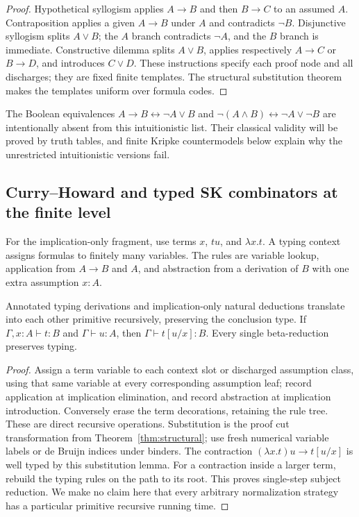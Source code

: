 \begin{proof}
Hypothetical syllogism applies $A\to B$ and then $B\to C$ to an assumed
$A$. Contraposition applies a given $A\to B$ under $A$ and contradicts
$\neg B$. Disjunctive syllogism splits $A\vee B$; the $A$ branch contradicts
$\neg A$, and the $B$ branch is immediate. Constructive dilemma splits
$A\vee B$, applies respectively $A\to C$ or $B\to D$, and introduces
$C\vee D$. These instructions specify each proof node and all discharges;
they are fixed finite templates. The structural substitution theorem
makes the templates uniform over formula codes.
\end{proof}

The Boolean equivalences $A\to B\leftrightarrow\neg A\vee B$ and
$\neg(A\wedge B)\leftrightarrow\neg A\vee\neg B$ are intentionally absent
from this intuitionistic list. Their classical validity will be proved
by truth tables, and finite Kripke countermodels below explain why the
unrestricted intuitionistic versions fail.

\subsection{Curry--Howard and typed SK combinators at the finite level}

For the implication-only fragment, use terms $x$, $tu$, and $\lambda x.t$.
A typing context assigns formulas to finitely many variables. The rules
are variable lookup, application from $A\to B$ and $A$, and abstraction
from a derivation of $B$ with one extra assumption $x:A$.

\begin{theorem}\label{thm:curry-howard}
Annotated typing derivations and implication-only natural deductions
translate into each other primitive recursively, preserving the conclusion
type. If $\Gamma,x:A\vdash t:B$ and $\Gamma\vdash u:A$, then
$\Gamma\vdash t[u/x]:B$. Every single beta-reduction preserves typing.
\end{theorem}
\begin{proof}
Assign a term variable to each context slot or discharged assumption class,
using that same variable at every corresponding assumption leaf; record application
at implication elimination, and record abstraction at implication
introduction. Conversely erase the term decorations, retaining the rule
tree. These are direct recursive operations. Substitution is the proof
cut transformation from Theorem~\ref{thm:structural}; use fresh numerical
variable labels or de Bruijn indices under binders. The contraction
$(\lambda x.t)u\longrightarrow t[u/x]$ is well typed by this substitution
lemma. For a contraction inside a larger term, rebuild the typing rules
on the path to its root. This proves single-step subject reduction.
We make no claim here that every arbitrary normalization strategy has a
particular primitive recursive running time.
\end{proof}

